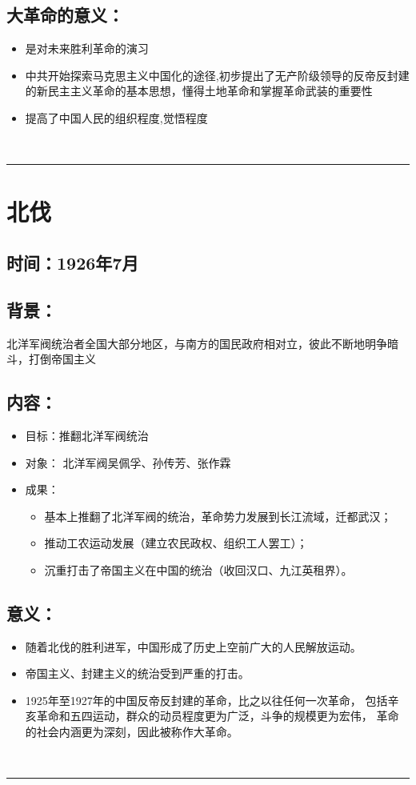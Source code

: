 \documentclass{article}
\begin{document}
\subsection*{大革命的意义：}
\begin{itemize}
	\item 是对未来胜利革命的演习
	\item 中共开始探索马克思主义中国化的途径,初步提出了无产阶级领导的反帝反封建的新民主主义革命的基本思想，懂得土地革命和掌握革命武装的重要性
	\item 提高了中国人民的组织程度,觉悟程度
\end{itemize}
\ \hrule

\section*{北伐}
\subsection*{时间：1926年7月}
\subsection*{背景：}
\noindent 北洋军阀统治者全国大部分地区，与南方的国民政府相对立，彼此不断地明争暗斗，打倒帝国主义
\subsection*{内容：}
\begin{itemize}
    \item 目标：推翻北洋军阀统治
    \item 对象： 北洋军阀吴佩孚、孙传芳、张作霖
    \item 成果： 
    \begin{itemize}
    	\item 基本上推翻了北洋军阀的统治，革命势力发展到长江流域，迁都武汉；
    \item  推动工农运动发展（建立农民政权、组织工人罢工）；
    \item 沉重打击了帝国主义在中国的统治（收回汉口、九江英租界）。
    \end{itemize}
\end{itemize}
\subsection*{意义：}
\begin{itemize}
    \item 随着北伐的胜利进军，中国形成了历史上空前广大的人民解放运动。
    \item 帝国主义、封建主义的统治受到严重的打击。
    \item 1925年至1927年的中国反帝反封建的革命，比之以往任何一次革命，
    包括辛亥革命和五四运动，群众的动员程度更为广泛，斗争的规模更为宏伟，
    革命的社会内涵更为深刻，因此被称作大革命。
\end{itemize}
\ \hrule
\end{document}

